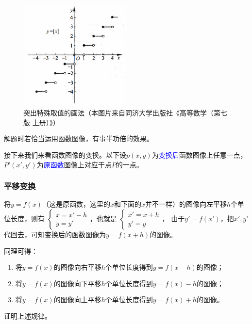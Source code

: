 \documentclass[lang=cn,math=cm,chinesefont=nofont,11pt,scheme=chinese,onecol]{elegantbook}
\begin{document}
\begin{figure}[h]
  \centering
  \includegraphics[width=0.5\textwidth]{image/2.1.5function6.png}
  \caption{突出特殊取值的画法（本图片来自同济大学出版社《高等数学（第七版 上册）》）}
  \label{img:2.1.5function6}
\end{figure}

解题时若恰当运用函数图像，有事半功倍的效果。

接下来我们来看函数图像的变换。以下设$p(x,y)$为\textcolor{blue}{变换后}函数图像上任意一点，$P'(x',y')$为\textcolor{blue}{原函数}图像上对应于点$P$的一点。

\subsubsection{平移变换}

将$y=f(x)$（这是原函数，这里的$x$和下面的$x$并不一样）的图像向左平移$h$个单位长度，则有
$\begin{cases}
  x=x'-h
  \\y=y'
\end{cases}$，也就是
$\begin{cases}
  x'=x+h
  \\y'=y
\end{cases}$，
由于$y'=f(x')$，把$x',y'$代回去，可知变换后的函数图像为$y=f(x+h)$的图像。

同理可得：

\begin{enumerate}
  \item 将$y=f(x)$的图像向右平移$h$个单位长度得到$y=f(x-h)$的图像；
  \item 将$y=f(x)$的图像向下平移$h$个单位长度得到$y=f(x)-h$的图像；
  \item 将$y=f(x)$的图像向上平移$h$个单位长度得到$y=f(x)+h$的图像。
\end{enumerate}

\begin{exercise}
  证明上述规律。
\end{exercise}
\end{document}
